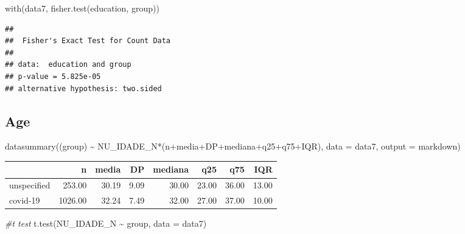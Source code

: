 \documentclass[
]{article}
\newenvironment{Shaded}{\begin{snugshade}}{\end{snugshade}}
\newcommand{\AttributeTok}[1]{\textcolor[rgb]{0.77,0.63,0.00}{#1}}
\newcommand{\CommentTok}[1]{\textcolor[rgb]{0.56,0.35,0.01}{\textit{#1}}}
\newcommand{\FunctionTok}[1]{\textcolor[rgb]{0.00,0.00,0.00}{#1}}
\newcommand{\NormalTok}[1]{#1}
\newcommand{\SpecialCharTok}[1]{\textcolor[rgb]{0.00,0.00,0.00}{#1}}
\newcommand{\StringTok}[1]{\textcolor[rgb]{0.31,0.60,0.02}{#1}}
\begin{document}
\begin{Shaded}
\begin{Highlighting}[]
\FunctionTok{with}\NormalTok{(data7, }\FunctionTok{fisher.test}\NormalTok{(education, group))}
\end{Highlighting}
\end{Shaded}

\begin{verbatim}
## 
##  Fisher's Exact Test for Count Data
## 
## data:  education and group
## p-value = 5.825e-05
## alternative hypothesis: two.sided
\end{verbatim}

\hypertarget{age}{%
\subsection{Age}\label{age}}

\begin{Shaded}
\begin{Highlighting}[]
\FunctionTok{datasummary}\NormalTok{((group) }\SpecialCharTok{\textasciitilde{}}\NormalTok{  NU\_IDADE\_N}\SpecialCharTok{*}\NormalTok{(n}\SpecialCharTok{+}\NormalTok{media}\SpecialCharTok{+}\NormalTok{DP}\SpecialCharTok{+}\NormalTok{mediana}\SpecialCharTok{+}\NormalTok{q25}\SpecialCharTok{+}\NormalTok{q75}\SpecialCharTok{+}\NormalTok{IQR),}
            \AttributeTok{data =}\NormalTok{ data7, }\AttributeTok{output =} \StringTok{\textquotesingle{}markdown\textquotesingle{}}\NormalTok{)}
\end{Highlighting}
\end{Shaded}

\begin{longtable}[]{@{}lrrrrrrr@{}}
\toprule
& n & media & DP & mediana & q25 & q75 & IQR \\
\midrule
\endhead
unspecified & 253.00 & 30.19 & 9.09 & 30.00 & 23.00 & 36.00 & 13.00 \\
covid-19 & 1026.00 & 32.24 & 7.49 & 32.00 & 27.00 & 37.00 & 10.00 \\
\bottomrule
\end{longtable}

\begin{Shaded}
\begin{Highlighting}[]
\CommentTok{\#t test}
\FunctionTok{t.test}\NormalTok{(NU\_IDADE\_N }\SpecialCharTok{\textasciitilde{}}\NormalTok{ group, }\AttributeTok{data =}\NormalTok{ data7)}
\end{Highlighting}
\end{Shaded}
\end{document}
